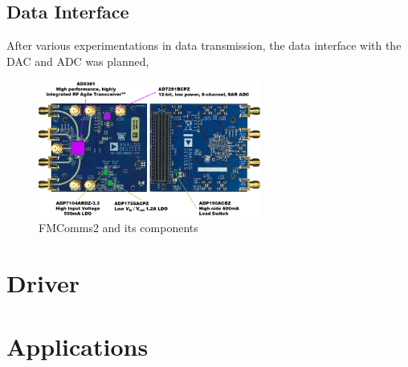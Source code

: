 \subsection{Data Interface}
After various experimentations in data transmission, the data interface with the
DAC and ADC was planned,

\begin{figure}[htbp]
    \centering
    \includegraphics[width=0.65\textwidth]{./figures/fmcomms2_pic}
    \caption{ FMComms2 and its components
    \label{fig:fmcomm}}
\end{figure}

\section{Driver}



\section{Applications}

